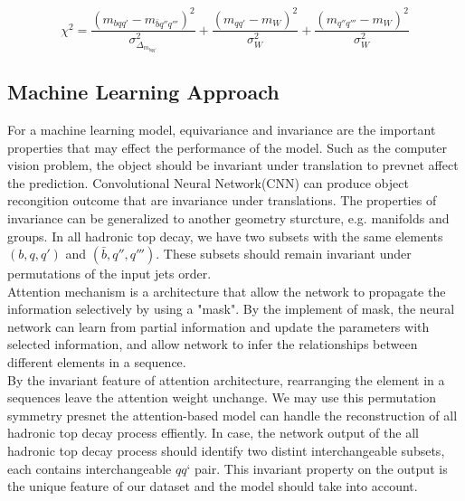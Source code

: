 \begin{equation}
	\chi^{2} = \frac{(m_{bqq'} - m_{\bar{b}q''q'''})^{2}}{\sigma^{2}_{\Delta_{m_{bqq'}}}}  + \frac{(m_{qq'} - m_{W})^{2}}{\sigma^{2}_{W}} + \frac{(m _{q''q'''} - m_{W})^{2}}{\sigma^{2}_{W}}
\end{equation} 


\subsection{Machine Learning Approach}\label{subsec:ML approach}

For a machine learning model, equivariance and invariance are the important properties that may effect the performance of the model. Such as the computer vision problem, the object should be invariant under translation to prevnet affect the prediction. Convolutional Neural Network(CNN) can produce object recongition outcome that are invariance under translations. The properties of invariance can be generalized to another geometry sturcture, e.g. manifolds and groups. In all hadronic top decay, we have two subsets with the same elements $(b, q, q')$ and $(\bar{b}, q'', q''')$. These subsets should remain invariant under permutations of the input jets order. 
\\
Attention mechanism is a architecture that allow the network to propagate the information selectively by using a "mask". By the implement of mask, the neural network can learn from partial information and update the parameters with selected information, and allow network to infer the relationships between different elements in a sequence.
\\
By the invariant feature of attention architecture, rearranging the element in a sequences leave the attention weight unchange. We may use this permutation symmetry presnet the attention-based model can handle the reconstruction of all hadronic top decay process effiently. In case, the network output of the all hadronic top decay process should identify two distint interchangeable subsets, each  contains interchangeable $qq‘$ pair. This invariant property on the output is the unique feature of our dataset and the model should take into account. 
\\

